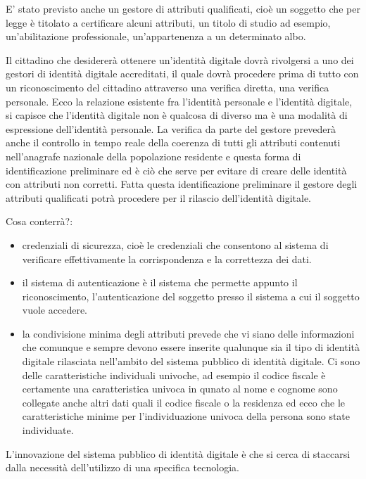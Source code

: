  E' stato previsto anche un gestore di attributi qualificati, cioè un soggetto che per legge è titolato a certificare alcuni attributi, un titolo di studio ad esempio, un'abilitazione professionale, un'appartenenza a un determinato albo.  \par
 Il cittadino che desidererà ottenere un'identità digitale dovrà rivolgersi a uno dei gestori di identità digitale accreditati, il quale dovrà procedere prima di tutto con un riconoscimento del cittadino attraverso una verifica diretta, una verifica personale. Ecco la relazione esistente fra l'identità personale e l'identità digitale, si capisce che l'identità digitale non è qualcosa di diverso ma è una modalità di espressione dell'identità personale. La verifica da parte del gestore prevederà anche il controllo in tempo reale della coerenza di tutti gli attributi contenuti nell'anagrafe nazionale della popolazione residente e questa forma di identificazione preliminare ed è ciò che serve per evitare di creare delle identità con attributi non corretti. 
 Fatta questa identificazione preliminare il gestore degli attributi qualificati potrà procedere per il rilascio dell'identità digitale.\par 
 Cosa conterrà?:
 \begin{itemize}
     \item credenziali di sicurezza, cioè le credenziali che consentono al sistema di verificare effettivamente la corrispondenza e la correttezza dei dati.
     \item il sistema di autenticazione è il sistema che permette appunto il riconoscimento, l'autenticazione del soggetto presso il sistema a cui il soggetto vuole accedere.
     \item la condivisione minima degli attributi prevede che vi siano delle informazioni che comunque e sempre devono essere inserite qualunque sia il tipo di identità digitale rilasciata nell'ambito del sistema pubblico di identità digitale. Ci sono delle caratteristiche individuali univoche, ad esempio il codice fiscale è certamente una caratteristica univoca in qunato al nome e cognome sono collegate anche altri dati quali il codice fiscale o la residenza ed ecco che le caratteristiche minime per l'individuazione univoca della persona sono state individuate.
 \end{itemize}

L'innovazione del sistema pubblico di identità digitale è che si cerca di staccarsi dalla necessità dell'utilizzo di una specifica tecnologia.\par    

